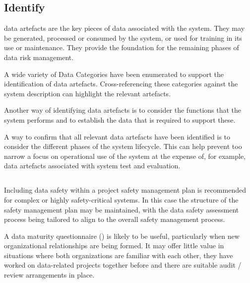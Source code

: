 \subsection{Identify }
\Glspl{data artefact} are the key pieces of data associated with the system. They may be generated, processed or consumed by the system, or used for training in its use or maintenance. They provide the foundation for the remaining phases of data risk management.

A wide variety of Data Categories have been enumerated to support the identification of \glspl{data artefact}. Cross-referencing these categories against the system description can highlight the relevant artefacts. 

Another way of identifying \glspl{data artefact} is to consider the functions that the system performs and to establish the data that is required to support these.

A way to confirm that all relevant \glspl{data artefact} have been identified is to consider the different phases of the system lifecycle. This can help prevent too narrow a focus on operational use of the system at the expense of, for example, \glspl{data artefact} associated with system test and evaluation.

\subsection{}

Including data safety within a project safety management plan is recommended for complex or highly safety-critical systems. In this case the structure of the safety management plan may be maintained, with the \gls{data safety assessment} process being tailored to align to the overall safety management process.

A data maturity questionnaire () is likely to be useful, particularly when new organizational relationships are being formed. It may offer little value in situations where both organizations are familiar with each other, they have worked on data-related projects together before and there are suitable audit / review arrangements in place.

